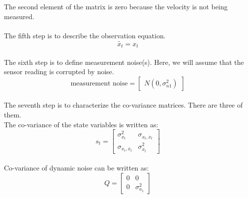 \documentclass[12pt]{article}
\begin{document}
The second element of the matrix is zero because the velocity is not being measured. \\
\\
The fifth step is to describe the observation equation.
\begin{equation}
\tilde{x_t} = x_t
\label{eq:1d obs eq}
\end{equation}
\\
The sixth step is to define measurement noise(s). Here, we will assume that the sensor reading is corrupted by noise.
\begin{equation}
\text{measurement noise} = 
\begin{bmatrix}
	N(0,\sigma^2_{n1})
\end{bmatrix}
\label{eq:1d mes noise}
\end{equation}
\\
The seventh step is to characterize the co-variance matrices. There are three of them.  \\
The co-variance of the state variables is written as:
\begin{equation}
s_t = 
\begin{bmatrix}
	\sigma^2_{x_t} & \sigma_{x_t,\dot{x_t}} \\
	\sigma_{x_t,\dot{x_t}} & \sigma^2_{\dot{x_t}}
\end{bmatrix}
\label{eq:1d state co-var}
\end{equation}
\\
Co-variance of dynamic noise can be written as:
\begin{equation}
Q = 
\begin{bmatrix}
	0 & 0 \\
	0 & \sigma^2_{a_1}
\end{bmatrix}
\label{eq:1d dyn co-var}
\end{equation}
\end{document}
